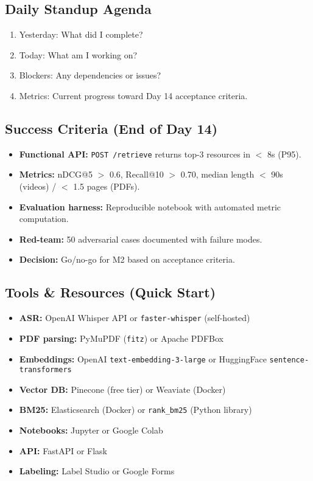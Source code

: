 \documentclass[11pt,letterpaper]{article}
\begin{document}
\subsection{Daily Standup Agenda}\label{subsec:daily-standup}

\begin{enumerate}
\item Yesterday: What did I complete?
\item Today: What am I working on?
\item Blockers: Any dependencies or issues?
\item Metrics: Current progress toward Day 14 acceptance criteria.
\end{enumerate}

\subsection{Success Criteria (End of Day 14)}\label{subsec:success-criteria}

\begin{itemize}
\item \textbf{Functional API:} \texttt{POST /retrieve} returns top-3 resources in $<$ 8s (P95).
\item \textbf{Metrics:} nDCG@5 $>$ 0.6, Recall@10 $>$ 0.70, median length $<$ 90s (videos) / $<$ 1.5 pages (PDFs).
\item \textbf{Evaluation harness:} Reproducible notebook with automated metric computation.
\item \textbf{Red-team:} 50 adversarial cases documented with failure modes.
\item \textbf{Decision:} Go/no-go for M2 based on acceptance criteria.
\end{itemize}

\subsection{Tools \& Resources (Quick Start)}\label{subsec:tools-resources}

\begin{itemize}
\item \textbf{ASR:} OpenAI Whisper API or \texttt{faster-whisper} (self-hosted)
\item \textbf{PDF parsing:} PyMuPDF (\texttt{fitz}) or Apache PDFBox
\item \textbf{Embeddings:} OpenAI \texttt{text-embedding-3-large} or HuggingFace \texttt{sentence-transformers}
\item \textbf{Vector DB:} Pinecone (free tier) or Weaviate (Docker)
\item \textbf{BM25:} Elasticsearch (Docker) or \texttt{rank\_bm25} (Python library)
\item \textbf{Notebooks:} Jupyter or Google Colab
\item \textbf{API:} FastAPI or Flask
\item \textbf{Labeling:} Label Studio or Google Forms
\end{itemize}
\end{document}

